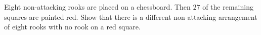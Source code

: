 Eight non-attacking rooks are placed on a chessboard. Then $27$ of the remaining squares are painted red. Show that there is a different non-attacking arrangement of eight rooks with no rook on a red square.
